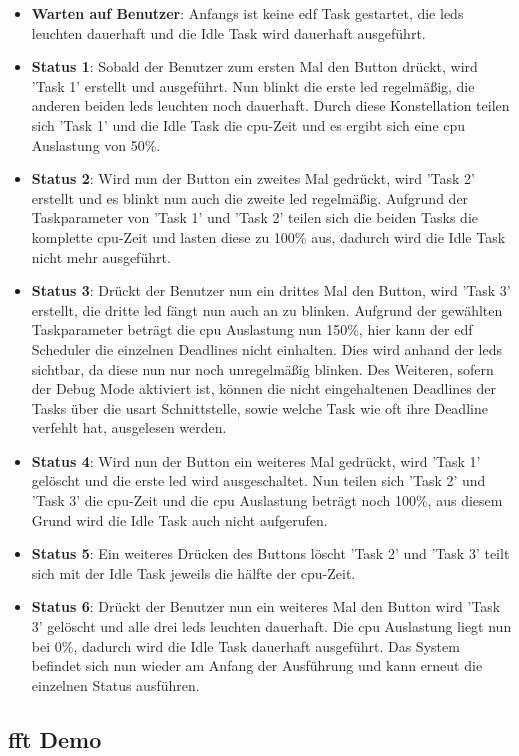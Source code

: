 \documentclass[../EDF Master Thesis.tex]{subfiles}
\begin{document}
        \begin{itemize}
            \item \textbf{Warten auf Benutzer}: Anfangs ist keine \ac{edf} Task gestartet, die \ac{led}s leuchten dauerhaft und die Idle Task wird dauerhaft ausgeführt.
            \item \textbf{Status 1}: Sobald der Benutzer zum ersten Mal den Button drückt, wird 'Task 1' erstellt und ausgeführt.
                Nun blinkt die erste \ac{led} regelmäßig, die anderen beiden \ac{led}s leuchten noch dauerhaft.
                Durch diese Konstellation teilen sich 'Task 1' und die Idle Task die \ac{cpu}-Zeit und es ergibt sich eine \ac{cpu} Auslastung von 50\%.
            \item \textbf{Status 2}: Wird nun der Button ein zweites Mal gedrückt, wird 'Task 2' erstellt und es blinkt nun auch die zweite \ac{led} regelmäßig.
                Aufgrund der Taskparameter von 'Task 1' und 'Task 2' teilen sich die beiden Tasks die komplette \ac{cpu}-Zeit und lasten diese zu 100\% aus, dadurch wird die Idle Task nicht mehr ausgeführt.
            \item \textbf{Status 3}: Drückt der Benutzer nun ein drittes Mal den Button, wird 'Task 3' erstellt, die dritte \ac{led} fängt nun auch an zu blinken.
                Aufgrund der gewählten Taskparameter beträgt die \ac{cpu} Auslastung nun 150\%, hier kann der \ac{edf} Scheduler die einzelnen Deadlines nicht einhalten.
                Dies wird anhand der \ac{led}s sichtbar, da diese nun nur noch unregelmäßig blinken.
                Des Weiteren, sofern der Debug Mode aktiviert ist, können die nicht eingehaltenen Deadlines der Tasks über die \ac{usart} Schnittstelle, sowie welche Task wie oft ihre Deadline verfehlt hat, ausgelesen werden.
            \item \textbf{Status 4}: Wird nun der Button ein weiteres Mal gedrückt, wird 'Task 1' gelöscht und die erste \ac{led} wird ausgeschaltet.
                Nun teilen sich 'Task 2' und 'Task 3' die \ac{cpu}-Zeit und die \ac{cpu} Auslastung beträgt noch 100\%, aus diesem Grund wird die Idle Task auch nicht aufgerufen.
            \item \textbf{Status 5}: Ein weiteres Drücken des Buttons löscht 'Task 2' und 'Task 3' teilt sich mit der Idle Task jeweils die hälfte der \ac{cpu}-Zeit.
            \item \textbf{Status 6}: Drückt der Benutzer nun ein weiteres Mal den Button wird 'Task 3' gelöscht und alle drei \ac{led}s leuchten dauerhaft.
                Die \ac{cpu} Auslastung liegt nun bei 0\%, dadurch wird die Idle Task dauerhaft ausgeführt.
                Das System befindet sich nun wieder am Anfang der Ausführung und kann erneut die einzelnen Status ausführen.
        \end{itemize}

    \subsection{\ac{fft} Demo} \label{section:fft_demo}
\end{document}
